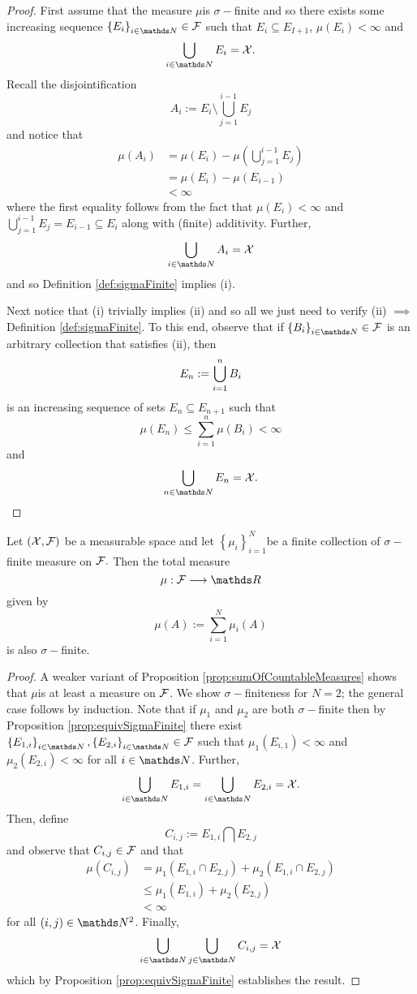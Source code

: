 \begin{proof}
First assume that the measure $\mu$is $\sigma-$finite and so there
exists some increasing sequence $\left\{ E_{i}\right\} _{i\in\N}\in\F$
such that $E_{i}\subseteq E_{I+1}$, $\mu\left(E_{i}\right)<\infty$
and 
\[
\bigcup_{i\in\N}E_{i}=\X.
\]
Recall the disjointification
\[
A_{i}:=E_{i}\setminus\bigcup_{j=1}^{i-1}E_{j}
\]
and notice that
\begin{align*}
\mu\left(A_{i}\right) & =\mu\left(E_{i}\right)-\mu\left(\bigcup_{j=1}^{i-1}E_{j}\right)\\
 & =\mu\left(E_{i}\right)-\mu\left(E_{i-1}\right)\\
 & <\infty
\end{align*}
where the first equality follows from the fact that $\mu\left(E_{i}\right)<\infty$
and $\bigcup_{j=1}^{i-1}E_{j}=E_{i-1}\subseteq E_{i}$ along with
(finite) additivity. Further,
\[
\bigcup_{i\in\N}A_{i}=\X
\]
 and so Definition \ref{def:sigmaFinite} implies (i).

Next notice that (i) trivially implies (ii) and so all we just need
to verify (ii) $\implies$Definition \ref{def:sigmaFinite}. To this
end, observe that if $\left\{ B_{i}\right\} _{i\in\N}\in\F$ is an
arbitrary collection that satisfies (ii), then
\[
E_{n}:=\text{\ensuremath{\bigcup_{i=1}^{n}B_{i}}}
\]
is an increasing sequence of sets $E_{n}\subseteq E_{n+1}$ such that
\[
\mu\left(E_{n}\right)\leq\sum_{i=1}^{n}\mu\left(B_{i}\right)<\infty
\]
and
\[
\bigcup_{n\in\N}E_{n}=\X.
\]
\end{proof}
\begin{prop}
\label{prop:sumSigmaFiniteMeasures}Let $\left(\mathcal{X},\mathcal{F}\right)$ be a
measurable space and let $\left\{ \mu_{i}\right\} _{i=1}^{N}$be a
finite collection of $\sigma-$finite measure on $\mathcal{F}.$ Then the total
measure
\[
\mu:\F\longrightarrow\R
\]
 given by
\[
\mu\left(A\right):=\sum_{i=1}^{N}\mu_{i}\left(A\right)
\]
is also $\sigma-$finite.
\end{prop}

\begin{proof}
A weaker variant of Proposition \ref{prop:sumOfCountableMeasures}
shows that $\mu$is at least a measure on $\mathcal{F}$. We show $\sigma-$finiteness
for $N=2$; the general case follows by induction. Note that if $\mu_{1}$
and $\mu_{2}$ are both $\sigma-$finite then by Proposition \ref{prop:equivSigmaFinite}
there exist $\left\{ E_{1,i}\right\} _{i\in\N},\left\{ E_{2,i}\right\} _{i\in\N}\in\F$
such that $\mu_{1}\left(E_{i,1}\right)<\infty$ and $\mu_{2}\left(E_{2,i}\right)<\infty$
for all $i\in\N$. Further,
\[
\bigcup_{i\in\N}E_{1,i}=\bigcup_{i\in\N}E_{2,i}=\X.
\]
Then, define
\[
C_{i,j}:=E_{1,i}\bigcap E_{2,j}
\]
and observe that $C_{i,j}\in\mathcal{F}$ and that 
\begin{align*}
\mu\left(C_{i,j}\right) & =\mu_{1}\left(E_{1,i}\cap E_{2,j}\right)+\mu_{2}\left(E_{1,i}\cap E_{2,j}\right)\\
 & \leq\mu_{1}\left(E_{1,i}\right)+\mu_{2}\left(E_{2,j}\right)\\
 & <\infty
\end{align*}
for all $\left(i,j\right)\in\N^{2}$. Finally,
\[
\bigcup_{i\in\N}\bigcup_{j\in\N}C_{i,j}=\X
\]
which by Proposition \ref{prop:equivSigmaFinite} establishes the
result.
\end{proof}


